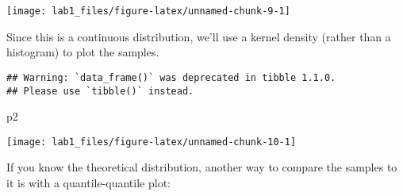 \documentclass[]{article}
\newenvironment{Shaded}{\begin{snugshade}}{\end{snugshade}}
\newcommand{\KeywordTok}[1]{\textcolor[rgb]{0.13,0.29,0.53}{\textbf{#1}}}
\newcommand{\DataTypeTok}[1]{\textcolor[rgb]{0.13,0.29,0.53}{#1}}
\newcommand{\DecValTok}[1]{\textcolor[rgb]{0.00,0.00,0.81}{#1}}
\newcommand{\FloatTok}[1]{\textcolor[rgb]{0.00,0.00,0.81}{#1}}
\newcommand{\StringTok}[1]{\textcolor[rgb]{0.31,0.60,0.02}{#1}}
\newcommand{\CommentTok}[1]{\textcolor[rgb]{0.56,0.35,0.01}{\textit{#1}}}
\newcommand{\OperatorTok}[1]{\textcolor[rgb]{0.81,0.36,0.00}{\textbf{#1}}}
\newcommand{\NormalTok}[1]{#1}
\begin{document}
\begin{center}\texttt{[image: lab1\_files/figure-latex/unnamed-chunk-9-1]} \end{center}

Since this is a continuous distribution, we'll use a kernel density
(rather than a histogram) to plot the samples.

\begin{Shaded}
\end{Shaded}

\begin{verbatim}
## Warning: `data_frame()` was deprecated in tibble 1.1.0.
## Please use `tibble()` instead.
\end{verbatim}

\begin{Shaded}
\begin{Highlighting}[]
\NormalTok{p2}
\end{Highlighting}
\end{Shaded}

\begin{center}\texttt{[image: lab1\_files/figure-latex/unnamed-chunk-10-1]} \end{center}

If you know the theoretical distribution, another way to compare the
samples to it is with a quantile-quantile plot:
\end{document}
